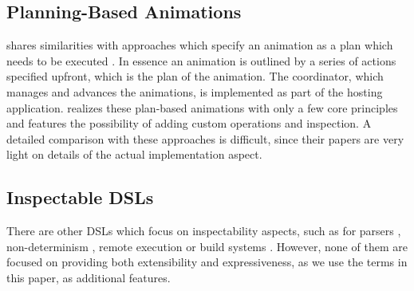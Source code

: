 \subsection{Planning-Based Animations}

\dsl{} shares similarities with approaches which specify an animation as a plan which needs to be executed \cite{DBLP:conf/chi/KurlanderL95,DBLP:conf/eics/MirlacherPB12}. In essence an animation is outlined by a series of actions specified upfront, which is the plan of the animation. The coordinator, which manages and advances the animations, is implemented as part of the hosting application. \dsl{} realizes these plan-based animations with only a few core principles and features the possibility of adding custom operations and inspection. A detailed comparison with these approaches is difficult, since their papers are very light on details of the actual implementation aspect.

\subsection{Inspectable DSLs}

There are other DSLs which focus on inspectability aspects, such as for parsers \cite{DBLP:journals/scp/Hughes00,DBLP:journals/corr/CapriottiK14,DBLP:conf/icfp/Lindley14}, non-determinism \cite{DBLP:journals/corr/abs-1905-06544}, remote execution \cite{DBLP:conf/haskell/Gibbons16,DBLP:conf/haskell/GillSDEFGRSS15} or build systems \cite{DBLP:journals/pacmpl/MokhovMJ18}. However, none of them are focused on providing both extensibility and expressiveness, as we use the terms in this paper, as additional features.

